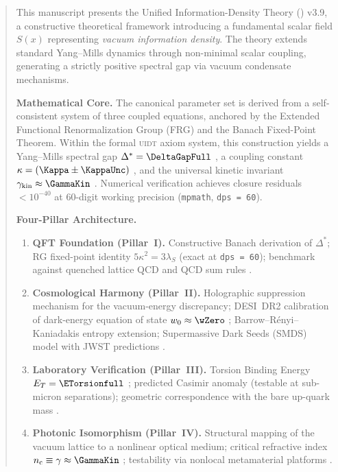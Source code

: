 \begin{abstract}
\noindent
This manuscript presents the Unified Information-Density Theory (\UIDT{})
v3.9, a constructive theoretical framework introducing a fundamental scalar
field $S(x)$ representing \emph{vacuum information density}. The theory
extends standard Yang--Mills dynamics through non-minimal scalar coupling,
generating a strictly positive spectral gap via vacuum condensate mechanisms.

\medskip\noindent
\textbf{Mathematical Core.}
The canonical parameter set is derived from a self-consistent system of three
coupled equations, anchored by the Extended Functional Renormalization Group
(FRG) and the Banach Fixed-Point Theorem. Within the formal \textsc{uidt}
axiom system, this construction yields a Yang--Mills spectral gap
$\Delta^* = \DeltaGapFull$ \evA{}, a coupling constant
$\kappa = (\Kappa \pm \KappaUnc)$ \evA{}, and the universal kinetic
invariant $\gamma_{\mathrm{kin}} \approx \GammaKin$ \evAminus{}.
Numerical verification achieves closure residuals ${<}10^{-40}$ at
60-digit working precision (\texttt{mpmath}, \texttt{dps\,=\,60}).

\medskip\noindent
\textbf{Four-Pillar Architecture.}
\begin{enumerate}[leftmargin=1.8em,itemsep=2pt]
  \item \textbf{QFT Foundation (Pillar~I).}
        Constructive Banach derivation of $\Delta^*$; RG fixed-point
        identity $5\kappa^2 = 3\lambda_S$ (exact at \texttt{dps\,=\,60});
        benchmark against quenched lattice QCD and QCD sum rules \evB{}.
  \item \textbf{Cosmological Harmony (Pillar~II).}
        Holographic suppression mechanism for the vacuum-energy discrepancy;
        DESI~DR2 calibration of dark-energy equation of state
        $w_0 \approx \wZero$ \evC{};
        Barrow--R\'{e}nyi--Kaniadakis entropy extension;
        Supermassive Dark Seeds (SMDS) model with JWST predictions \evC{}.
  \item \textbf{Laboratory Verification (Pillar~III).}
        Torsion Binding Energy $E_T = \ETorsionfull$ \evC{};
        predicted Casimir anomaly (testable at sub-micron separations);
        geometric correspondence with the bare up-quark mass \evC{}.
  \item \textbf{Photonic Isomorphism (Pillar~IV).}
        Structural mapping of the vacuum lattice to a nonlinear optical
        medium; critical refractive index
        $n_{\mathrm{c}} \equiv \gamma \approx \GammaKin$ \evD{};
        testability via nonlocal metamaterial platforms \evD{}.
\end{enumerate}


\end{abstract}
